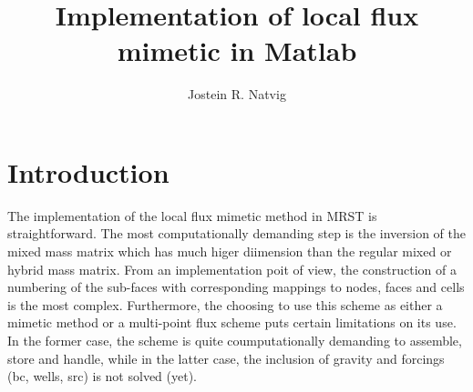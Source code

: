 \documentclass[11pt,fleqn]{amsart}
\begin{document}
\title[Local flux mimetic in Matlab]{Implementation of local flux mimetic in Matlab}%
\author[J.~R.~Natvig]{Jostein R. Natvig}%
\address{SINTEF ICT, Applied Mathematics, P.O.~Box 124 Blindern, N--0314 Oslo, Norway}



\maketitle

\section{Introduction}
The implementation of the local flux mimetic method in MRST
\citep{MRST} is straightforward.  The most computationally demanding
step is the inversion of the mixed mass matrix which has much higer
diimension than the regular mixed or hybrid mass matrix.  From an
implementation poit of view, the construction of a numbering of the
sub-faces with corresponding mappings to nodes, faces and cells is the
most complex.  Furthermore, the choosing to use this scheme as either
a mimetic method or a multi-point flux scheme puts certain limitations
on its use. In the former case, the scheme is quite coumputationally
demanding to assemble, store and handle, while in the latter case, the
inclusion of gravity and forcings (bc, wells, src) is not solved
(yet).
\end{document}
